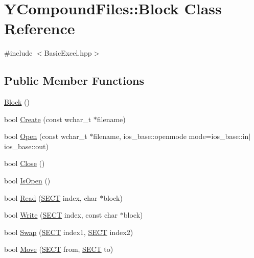 \hypertarget{class_y_compound_files_1_1_block}{}\section{Y\+Compound\+Files\+:\+:Block Class Reference}
\label{class_y_compound_files_1_1_block}


{\ttfamily \#include $<$Basic\+Excel.\+hpp$>$}

\subsection*{Public Member Functions}
\begin{DoxyCompactItemize}
\item 
\hyperlink{class_y_compound_files_1_1_block_a374eb0f21a455ef899e5ed6e991a428b}{Block} ()
\item 
bool \hyperlink{class_y_compound_files_1_1_block_aee3a1b1e06f4223074a45757c98fe526}{Create} (const wchar\+\_\+t $\ast$filename)
\item 
bool \hyperlink{class_y_compound_files_1_1_block_a70d0b714b2d9702ea4c0bd57f3e8f8c8}{Open} (const wchar\+\_\+t $\ast$filename, ios\+\_\+base\+::openmode mode=ios\+\_\+base\+::in$\vert$ios\+\_\+base\+::out)
\item 
bool \hyperlink{class_y_compound_files_1_1_block_adf23374593e51d1b9d73fbce64016b51}{Close} ()
\item 
bool \hyperlink{class_y_compound_files_1_1_block_ab3cea455bdc27ee87c69ccb9ffda88c9}{Is\+Open} ()
\item 
bool \hyperlink{class_y_compound_files_1_1_block_aa0520832315f65328ef3938c48cc2e86}{Read} (\hyperlink{_basic_excel_8hpp_a784c2e2144ab372c047faeeb0f6a9e6b}{S\+E\+C\+T} index, char $\ast$block)
\item 
bool \hyperlink{class_y_compound_files_1_1_block_a14d4e0c3f598c418f92a7ef69e62f4a2}{Write} (\hyperlink{_basic_excel_8hpp_a784c2e2144ab372c047faeeb0f6a9e6b}{S\+E\+C\+T} index, const char $\ast$block)
\item 
bool \hyperlink{class_y_compound_files_1_1_block_a1f6f350180e78cd2f867058927edcdae}{Swap} (\hyperlink{_basic_excel_8hpp_a784c2e2144ab372c047faeeb0f6a9e6b}{S\+E\+C\+T} index1, \hyperlink{_basic_excel_8hpp_a784c2e2144ab372c047faeeb0f6a9e6b}{S\+E\+C\+T} index2)
\item 
bool \hyperlink{class_y_compound_files_1_1_block_acc1a8af9c35d14a7c40355c0befb320c}{Move} (\hyperlink{_basic_excel_8hpp_a784c2e2144ab372c047faeeb0f6a9e6b}{S\+E\+C\+T} from, \hyperlink{_basic_excel_8hpp_a784c2e2144ab372c047faeeb0f6a9e6b}{S\+E\+C\+T} to)

\end{DoxyCompactItemize}

